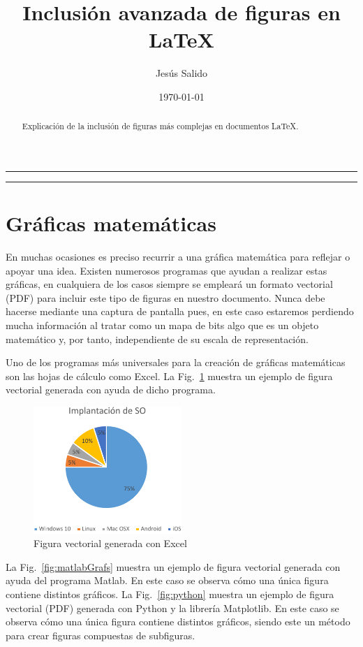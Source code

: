 \documentclass[11pt,a4paper]{article}
\author{Jesús Salido}
\title{Inclusión avanzada de figuras en \LaTeX{}}
\date{\today}
\begin{document}
\maketitle

\begin{abstract}
	Explicación de la inclusión de figuras más complejas en documentos \LaTeX{}.
\end{abstract}

\hrule
\tableofcontents
\listoffigures
\bigskip
\hrule

\section{Gráficas matemáticas}
En muchas ocasiones es preciso recurrir a una gráfica matemática para reflejar o apoyar una idea. Existen numerosos programas que ayudan a realizar estas gráficas, en cualquiera de los casos siempre se empleará un formato vectorial (\textsf{PDF}) para incluir este tipo de figuras en nuestro documento. Nunca debe hacerse mediante una captura de pantalla pues, en este caso estaremos perdiendo mucha información al tratar como un mapa de bits algo que es un objeto matemático y, por tanto, independiente de su escala de representación.

Uno de los programas más universales para la creación de gráficas matemáticas son las hojas de cálculo como Excel. La Fig.~\ref{fig:excel} muestra un ejemplo de figura vectorial generada con ayuda de dicho programa.

\begin{figure}[hbt]
	\centering
	\includegraphics[width=0.5\textwidth]{../figs/EjFigsExcelOrig-crop} 
	\caption[Gráfico de Excel]{Figura vectorial generada con Excel}
	\label{fig:excel}
\end{figure}

La Fig.~\ref{fig:matlabGrafs} muestra un ejemplo de figura vectorial generada con ayuda del programa Matlab. En este caso se observa cómo una única figura contiene distintos gráficos. La Fig.~\ref{fig:python} muestra un ejemplo de figura vectorial (\textsf{PDF}) generada con Python y la librería \textsf{Matplotlib}. En este caso se observa cómo una única figura contiene distintos gráficos, siendo este un método para crear figuras compuestas de subfiguras.
\end{document}
